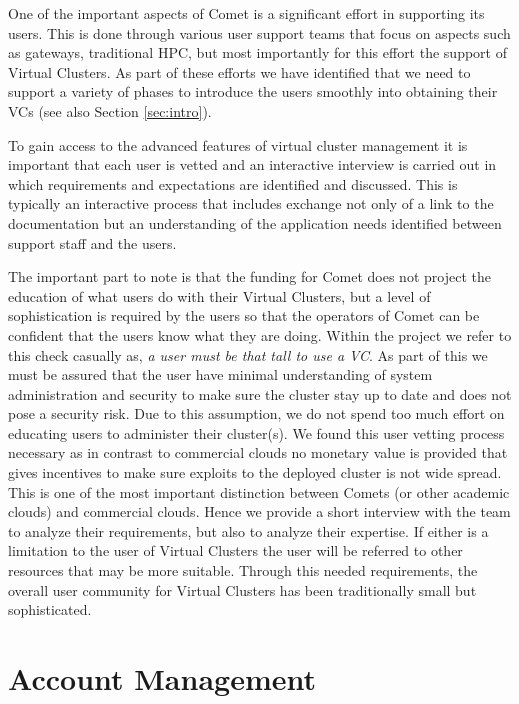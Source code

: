 \documentclass[sigconf,hyphens]{acmart}
\begin{document}
One of the important aspects of Comet is a significant effort in
supporting its users. This is done through various user support teams
that focus on aspects such as gateways, traditional HPC, but most
importantly for this effort the support of Virtual Clusters. As part
of these efforts we have identified that we need to support a variety
of phases to introduce the users smoothly into obtaining their VCs
(see also Section \ref{sec:intro}).

To gain access to the advanced features of virtual cluster management
it is important that each user is vetted and an interactive interview
is carried out in which requirements and expectations are identified
and discussed. This is typically an interactive process that includes
exchange not only of a link to the documentation but an understanding
of the application needs identified between support staff and the
users.

The important part to note is that the funding for Comet does not
project the education of what users do with their Virtual Clusters,
but a level of sophistication is required by the users so that the
operators of Comet can be confident that the users know what they are
doing. Within the project we refer to this check casually as,
\textit{a user must be that tall to use a VC}. As part of this we must
be assured that the user have minimal understanding of system
administration and security to make sure the cluster stay up to date
and does not pose a security risk. Due to this assumption, we do not
spend too much effort on educating users to administer their
cluster(s). We found this user vetting process necessary as in
contrast to commercial clouds no monetary value is provided that gives
incentives to make sure exploits to the deployed cluster is not wide
spread. This is one of the most important distinction between Comets
(or other academic clouds) and commercial clouds. Hence we provide a
short interview with the team to analyze their requirements, but also
to analyze their expertise. If either is a limitation to the user of
Virtual Clusters the user will be referred to other resources that may
be more suitable. Through this needed requirements, the overall user
community for Virtual Clusters has been traditionally small but
sophisticated.

\section{Account Management}\label{sec:account}
\end{document}
